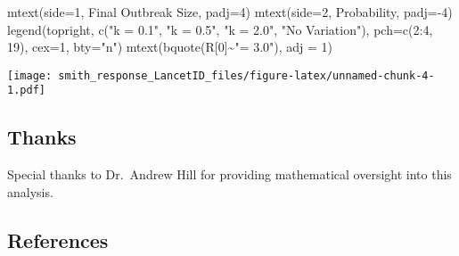 \documentclass[
]{article}
\newenvironment{Shaded}{\begin{snugshade}}{\end{snugshade}}
\newcommand{\AttributeTok}[1]{\textcolor[rgb]{0.77,0.63,0.00}{#1}}
\newcommand{\DecValTok}[1]{\textcolor[rgb]{0.00,0.00,0.81}{#1}}
\newcommand{\FunctionTok}[1]{\textcolor[rgb]{0.00,0.00,0.00}{#1}}
\newcommand{\NormalTok}[1]{#1}
\newcommand{\SpecialCharTok}[1]{\textcolor[rgb]{0.00,0.00,0.00}{#1}}
\newcommand{\StringTok}[1]{\textcolor[rgb]{0.31,0.60,0.02}{#1}}
\begin{document}
\begin{Shaded}
\begin{Highlighting}[]
  \FunctionTok{mtext}\NormalTok{(}\AttributeTok{side=}\DecValTok{1}\NormalTok{, }\StringTok{\textquotesingle{}Final Outbreak Size\textquotesingle{}}\NormalTok{, }\AttributeTok{padj=}\DecValTok{4}\NormalTok{)}
  \FunctionTok{mtext}\NormalTok{(}\AttributeTok{side=}\DecValTok{2}\NormalTok{, }\StringTok{\textquotesingle{}Probability\textquotesingle{}}\NormalTok{, }\AttributeTok{padj=}\SpecialCharTok{{-}}\DecValTok{4}\NormalTok{)}
  \FunctionTok{legend}\NormalTok{(}\StringTok{\textquotesingle{}topright\textquotesingle{}}\NormalTok{, }\FunctionTok{c}\NormalTok{(}\StringTok{"k = 0.1"}\NormalTok{, }\StringTok{"k = 0.5"}\NormalTok{, }\StringTok{"k = 2.0"}\NormalTok{, }\StringTok{"No Variation"}\NormalTok{), }
         \AttributeTok{pch=}\FunctionTok{c}\NormalTok{(}\DecValTok{2}\SpecialCharTok{:}\DecValTok{4}\NormalTok{, }\DecValTok{19}\NormalTok{), }\AttributeTok{cex=}\DecValTok{1}\NormalTok{, }\AttributeTok{bty=}\StringTok{"n"}\NormalTok{)}
  \FunctionTok{mtext}\NormalTok{(}\FunctionTok{bquote}\NormalTok{(R[}\DecValTok{0}\NormalTok{]}\SpecialCharTok{\textasciitilde{}}\StringTok{"= 3.0"}\NormalTok{), }\AttributeTok{adj =} \DecValTok{1}\NormalTok{)}
\end{Highlighting}
\end{Shaded}

\texttt{[image: smith\_response\_LancetID\_files/figure-latex/unnamed-chunk-4-1.pdf]}

\hypertarget{thanks}{%
\subsection{Thanks}\label{thanks}}

Special thanks to Dr.~Andrew Hill for providing mathematical oversight
into this analysis.

\hypertarget{references}{%
\subsection{References}\label{references}}
\end{document}
